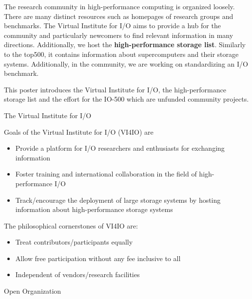 \documentclass[portrait,a0paper,fontscale=0.4]{baposter}
\newcommand{\compresslist}{%
\setlength{\itemsep}{1pt}%
\setlength{\parskip}{0pt}%
\setlength{\parsep}{0pt}%
}
\begin{document}
\begin{poster}
\begin{posterbox}[name=problem,column=0]
The research community in high-performance computing is organized loosely.
There are many distinct resources such as homepages of research groups and benchmarks.
The Virtual Institute for I/O aims to provide a hub for the community and particularly newcomers to find relevant information in many directions.
Additionally, we host the \textbf{high-performance storage list}. Similarly to the top500, it contains information about supercomputers and their storage systems.
Additionally, in the community, we are working on standardizing an I/O benchmark.

This poster introduces the Virtual Institute for I/O, the high-performance storage list and the effort for the IO-500 which are unfunded community projects.
\end{posterbox}


\begin{posterbox}[name=approach,column=0,below=problem]
{The Virtual Institute for I/O}


Goals of the Virtual Institute for I/O (VI4IO) are
\vspace*{-1em}
\begin{itemize}\compresslist
\item Provide a platform for I/O researchers and enthusiasts for exchanging information
\item Foster training and international collaboration in the field of high-performance I/O
\item Track/encourage the deployment of large storage systems by hosting information about high-performance storage systems
\end{itemize}
\vspace*{-1em}

The philosophical cornerstones of VI4IO are:

\vspace*{-1em}
\begin{itemize}\compresslist
\item Treat contributors/participants equally
\item Allow free participation without any fee inclusive to all
\item Independent of vendors/research facilities
\end{itemize}
\end{posterbox}


\begin{posterbox}[name=overview,column=0,below=approach]{Open Organization}


\end{posterbox}
\end{poster}
\end{document}
